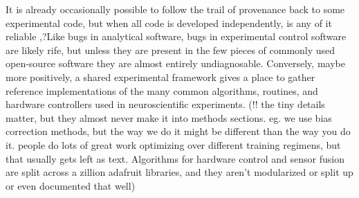 \documentclass{article}
\begin{document}
It is already occasionally possible to follow the trail of provenance
back to some experimental code, but when all code is developed
independently, is any of it reliable \cite{wallReliabilityStartsExperimental2018},?Like bugs in analytical
software, bugs in experimental control software are likely rife, but
unless they are present in the few pieces of commonly used open-source
software they are almost entirely undiagnosable. Conversely, maybe more
positively, a shared experimental framework gives a place to gather
reference implementations of the many common algorithms, routines, and
hardware controllers used in neuroscientific experiments. (!! the tiny
details matter, but they almost never make it into methods sections. eg.
we use bias correction methods, but the way we do it might be different
than the way you do it. people do lots of great work optimizing over
different training regimens, but that usually gets left as text.
Algorithms for hardware control and sensor fusion are split across a
zillion adafruit libraries, and they aren't modularized or split up or
even documented that well)
\end{document}
